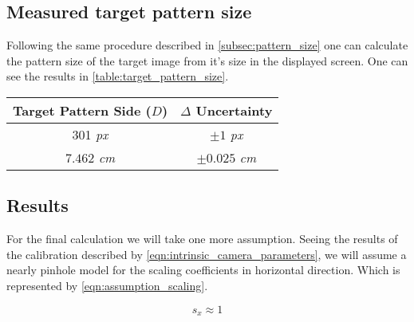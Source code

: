 \documentclass[
a4paper,
12pt,
]{article}
\begin{document}
\clearpage

\subsection{Measured target pattern size}
\label{subsec:target_pattern_size}


Following the same procedure described in \autoref{subsec:pattern_size} one can calculate the pattern size of the target image from it's size in the displayed screen. One can see the results in  \autoref{table:target_pattern_size}.
\medskip

\begin{center}
\begin{tabular}{c|c}
\hline
\textbf{Target Pattern Side ($D$)}	
	& $\Delta$ \textbf{Uncertainty}	\\
\hline
301 \emph{px}
	& $\pm 1$ \emph{px}	\\
\hline
$7.462$ \emph{cm}
	& $\pm 0.025$ \emph{cm}	\\
\hline
\end{tabular}
\label{table:target_pattern_size}
\end{center}

\subsection{Results}
\label{subsec:results}

For the final calculation we will take one more assumption. Seeing the results of the calibration described by \autoref{eqn:intrinsic_camera_parameters}, we will assume a nearly pinhole model for the scaling coefficients in horizontal direction. Which is represented by \autoref{eqn:assumption_scaling}.

\begin{equation}
\label{eqn:assumption_scaling}
s_x \approx 1
\end{equation}
\end{document}
